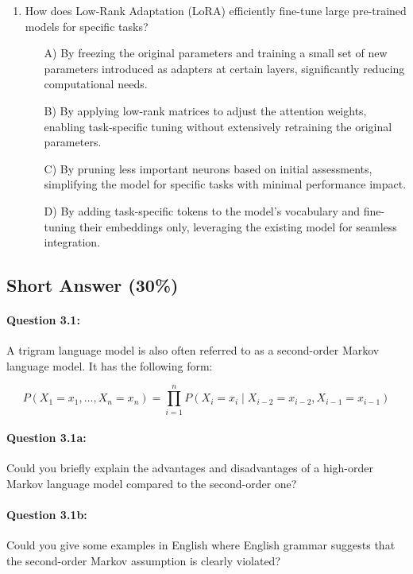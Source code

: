 \documentclass[10pt]{article}
\begin{document}
\begin{enumerate}
\item How does Low-Rank Adaptation (LoRA) efficiently fine-tune large pre-trained models for specific tasks?
    \begin{itemize}
        \item[A)] By freezing the original parameters and training a small set of new parameters introduced as adapters at certain layers, significantly reducing computational needs.
        \item[B)] By applying low-rank matrices to adjust the attention weights, enabling task-specific tuning without extensively retraining the original parameters.
        \item[C)] By pruning less important neurons based on initial assessments, simplifying the model for specific tasks with minimal performance impact.
        \item[D)] By adding task-specific tokens to the model’s vocabulary and fine-tuning their embeddings only, leveraging the existing model for seamless integration.
    \end{itemize}



\end{enumerate}

\newpage
\subsection{Short Answer (30\%)}
\paragraph{Question 3.1:} A trigram language model is also often referred to as a second-order Markov language model. It has the following form:

$$
  P\left(X_{1}=x_{1}, \ldots, X_{n}=x_{n}\right)=\prod_{i=1}^{n} P\left(X_{i}=x_{i} \mid X_{i-2}=x_{i-2}, X_{i-1}=x_{i-1}\right)
$$

\paragraph{Question 3.1a:} Could you briefly explain the advantages and disadvantages of a high-order Markov language model compared to the second-order one?

\paragraph{Question 3.1b:} Could you give some examples in English where English grammar suggests that the second-order Markov assumption is clearly violated?
\end{document}
